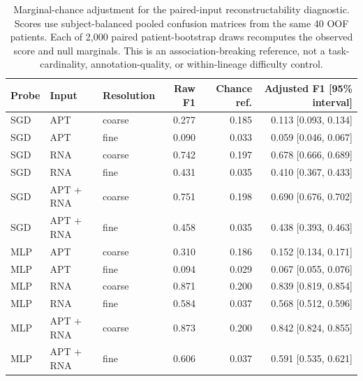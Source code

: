 \begin{table}[htbp]
\centering\small
\setlength{\tabcolsep}{4pt}
\begin{tabular}{lllrrr}
\toprule
Probe & Input & Resolution & Raw F1 & Chance ref. & Adjusted F1 [95\% interval] \\
\midrule
SGD & APT & coarse & 0.277 & 0.185 & 0.113 [0.093, 0.134] \\
SGD & APT & fine & 0.090 & 0.033 & 0.059 [0.046, 0.067] \\
SGD & RNA & coarse & 0.742 & 0.197 & 0.678 [0.666, 0.689] \\
SGD & RNA & fine & 0.431 & 0.035 & 0.410 [0.367, 0.433] \\
SGD & APT + RNA & coarse & 0.751 & 0.198 & 0.690 [0.676, 0.702] \\
SGD & APT + RNA & fine & 0.458 & 0.035 & 0.438 [0.393, 0.463] \\
\midrule
MLP & APT & coarse & 0.310 & 0.186 & 0.152 [0.134, 0.171] \\
MLP & APT & fine & 0.094 & 0.029 & 0.067 [0.055, 0.076] \\
MLP & RNA & coarse & 0.871 & 0.200 & 0.839 [0.819, 0.854] \\
MLP & RNA & fine & 0.584 & 0.037 & 0.568 [0.512, 0.596] \\
MLP & APT + RNA & coarse & 0.873 & 0.200 & 0.842 [0.824, 0.855] \\
MLP & APT + RNA & fine & 0.606 & 0.037 & 0.591 [0.535, 0.621] \\
\bottomrule
\end{tabular}
\caption{Marginal-chance adjustment for the paired-input reconstructability diagnostic. Scores use subject-balanced pooled confusion matrices from the same 40 OOF patients. Each of 2{,}000 paired patient-bootstrap draws recomputes the observed score and null marginals. This is an association-breaking reference, not a task-cardinality, annotation-quality, or within-lineage difficulty control.}
\label{tab:granularity_chance}
\end{table}
